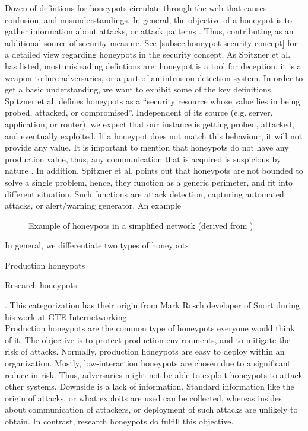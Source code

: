Dozen of defintions for honeypots circulate through the web that causes confusion, and misunderstandings. In general, the objective of a honeypot is to gather information about attacks, or attack patterns \cite{NawrockiWSKS2016}. Thus, contributing as an additional source of security measure. See \autoref{subsec:honeypot-security-concept} for a detailed view regarding honeypots in the security concept. As Spitzner et al. \cite{Spitzner2003} has listed, most misleading defintions are: honeypot is a tool for deception, it is a weapon to lure adversaries, or a part of an intrusion detection system. In order to get a basic understanding, we want to exhibit some of the key definitions. Spitzner et al. \cite{Spitzner2003} defines honeypots as a \enquote{security resource whose value lies in being probed, attacked, or compromised}. Independent of its source (e.g. server, application, or router), we expect that our instance is getting probed, attacked, and eventually exploited. If a honeypot does not match this behaviour, it will not provide any value. It is important to mention that honeypots do not have any production value, thus, any communication that is acquired is suspicious by nature \cite{Spitzner2003}. In addition, Spitzner et al. points out that honeypots are not bounded to solve a single problem, hence, they function as a generic perimeter, and fit into different situation. Such functions are attack detection, capturing automated attacks, or alert/warning generator. An example 

\begin{figure}[h]
    \centering
    
    \caption{Example of honeypots in a simplified network (derived from \cite{Spitzner2003})}
    \label{fig:honeypot-example}
\end{figure}

In general, we differentiate two types of honeypots
\begin{enumerate*}[label=(\roman*)]
    \item Production honeypots
    \item Research honeypots
\end{enumerate*}. This categorization has their origin from Mark Rosch developer of Snort during his work at GTE Internetworking.\\

Production honeypots are the common type of honeypots everyone would think of it. The objective is to protect production environments, and to mitigate the risk of attacks. Normally, production honeypots are easy to deploy within an organization. Mostly, low-interaction honeypots are chosen due to a significant reduce in risk. Thus, adversaries might not be able to exploit honeypots to attack other systems. Downside is a lack of information. Standard information like the origin of attacks, or what exploits are used can be collected, whereas insides about communication of attackers, or deployment of such attacks are unlikely to obtain. In contrast, research honeypots do fulfill this objective.\cite{Spitzner2003}\\

